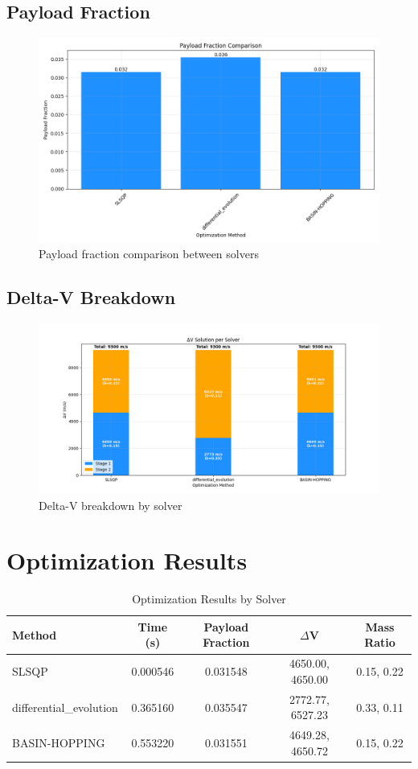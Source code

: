 \documentclass{article}
\begin{document}
\subsection{Payload Fraction}
\begin{figure}[H]
\centering
\includegraphics[width=\textwidth]{payload_fraction.png}
\caption{Payload fraction comparison between solvers}
\end{figure}

\subsection{Delta-V Breakdown}
\begin{figure}[H]
\centering
\includegraphics[width=\textwidth]{dv_breakdown.png}
\caption{Delta-V breakdown by solver}
\end{figure}

\section{Optimization Results}
\begin{table}[H]
\centering
\caption{Optimization Results by Solver}
\small
\begin{tabular}{lcccc}
\toprule
Method & Time (s) & Payload Fraction & $\Delta$V & Mass Ratio \\
\midrule
SLSQP & 0.000546 & 0.031548 & 4650.00, 4650.00 & 0.15, 0.22 \\
differential_evolution & 0.365160 & 0.035547 & 2772.77, 6527.23 & 0.33, 0.11 \\
BASIN-HOPPING & 0.553220 & 0.031551 & 4649.28, 4650.72 & 0.15, 0.22 \\
\bottomrule
\end{tabular}
\end{table}
\end{document}
